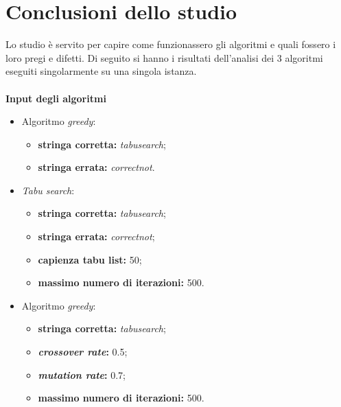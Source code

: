 \section{Conclusioni dello studio}
\label{conclusione-studio-fattibilita}
\noindent Lo studio è servito per capire come funzionassero gli algoritmi e quali fossero i loro pregi e difetti.
Di seguito si hanno i risultati dell'analisi dei 3 algoritmi eseguiti singolarmente su una singola istanza.\\
\\
\noindent \textbf{Input degli algoritmi}
\begin{itemize}
    \item Algoritmo \textit{greedy}:
    \begin{itemize}
        \item \textbf{stringa corretta:} \textit{tabusearch};
        \item \textbf{stringa errata:} \textit{correctnot}.
    \end{itemize}
    \item \textit{Tabu search}:
    \begin{itemize}
        \item \textbf{stringa corretta:} \textit{tabusearch};
        \item \textbf{stringa errata:} \textit{correctnot};
        \item \textbf{capienza tabu list:} 50;
        \item \textbf{massimo numero di iterazioni:} 500.
    \end{itemize}
    \item Algoritmo \textit{greedy}:
    \begin{itemize}
        \item \textbf{stringa corretta:} \textit{tabusearch};
        \item \textbf{\textit{crossover rate}:} 0.5;
        \item \textbf{\textit{mutation rate}:} 0.7;
        \item \textbf{massimo numero di iterazioni:} 500.
    \end{itemize}
\end{itemize}

\renewcommand{\arraystretch}{1.6}

